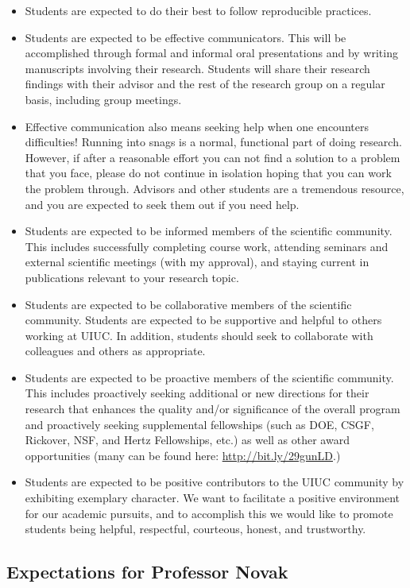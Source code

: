 \documentclass[12pt,twoside]{article}
\begin{document}
\begin{itemize}
\item Students are expected to do their best to follow reproducible practices. 
\item Students are expected to be effective communicators. This will be accomplished through formal and informal oral presentations and by writing manuscripts involving their research. Students will share their research findings with their advisor and the rest of the research group on a regular basis, including group meetings.  
\item Effective communication also means seeking help when one encounters difficulties! Running into snags is a normal, functional part of doing research. However, if after a reasonable effort you can not find a solution to a problem that you face, please do not continue in isolation hoping that you can work the problem through. Advisors and other students are a tremendous resource, and you are expected to seek them out if you need help.
\item Students are expected to be informed members of the scientific community. This includes successfully completing course work, attending seminars and external scientific meetings (with my approval), and staying current in publications relevant to your research topic. 
\item Students are expected to be collaborative members of the scientific community. Students are expected to be supportive and helpful to others working at UIUC. In addition, students should seek to collaborate with colleagues and others as appropriate.
\item Students are expected to be proactive members of the scientific community. This includes proactively seeking additional or new directions for their research that enhances the quality and/or significance of the overall program and proactively seeking supplemental fellowships (such as DOE, CSGF, Rickover, NSF, and Hertz Fellowships, etc.) as well as other award opportunities (many can be found here: \url{http://bit.ly/29gunLD}.)
\item Students are expected to be positive contributors to the UIUC community by exhibiting exemplary character. We want to facilitate a positive environment for our academic pursuits, and to accomplish this we would like to promote students being helpful, respectful, courteous, honest, and trustworthy. 
\end{itemize}

\begin{center}
\section*{Expectations for Professor Novak}
\end{center}
\end{document}
